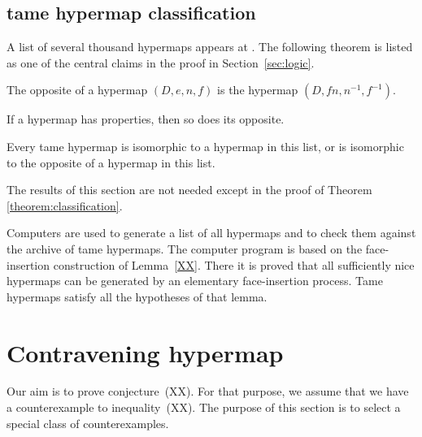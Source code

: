\subsection{tame hypermap classification}
    \label{sec:proof-classification}

\label{sec:classification}

A list of several thousand hypermaps appears at \cite{web}. The
following theorem is listed as one of the central claims in the
proof in Section~\ref{sec:logic}.

\begin{definition}[opposite] The opposite of a hypermap $(D,e,n,f)$ is the
hypermap $(D,f n,n^{-1},f^{-1})$.
\end{definition}

\begin{lemma} If a hypermap has properties, 
then so does its opposite.
\end{lemma}

\begin{theorem}
\label{theorem:classification} Every tame hypermap is isomorphic to
a hypermap in this list, or is isomorphic to the opposite of a
hypermap in this list.
\end{theorem}

The results of this section are not needed except in the proof of
Theorem \ref{theorem:classification}.

\smallskip

Computers are used to generate a list of all hypermaps and to check
them against the archive of tame hypermaps.  The computer program is
based on the face-insertion construction of Lemma~\ref{XX}.  There it is
proved that all sufficiently nice hypermaps can be generated by an
elementary face-insertion process.  Tame hypermaps satisfy all the
hypotheses of that lemma.

\section{Contravening hypermap}

Our aim is to prove conjecture~(XX).  For that purpose, we assume that
we have a counterexample to inequality~(XX).  The purpose of this section is to select a special class of counterexamples.

